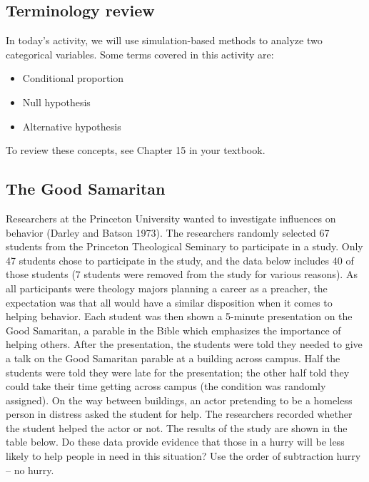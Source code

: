 \documentclass[
]{report}
\begin{document}
\subsection{Terminology review}\label{terminology-review-16}

In today's activity, we will use simulation-based methods to analyze two categorical variables. Some terms covered in this activity are:

\begin{itemize}
\item
  Conditional proportion
\item
  Null hypothesis
\item
  Alternative hypothesis
\end{itemize}

To review these concepts, see Chapter 15 in your textbook.

\subsection{The Good Samaritan}\label{the-good-samaritan}

Researchers at the Princeton University wanted to investigate influences on behavior (Darley and Batson 1973). The researchers randomly selected 67 students from the Princeton Theological Seminary to participate in a study. Only 47 students chose to participate in the study, and the data below includes 40 of those students (7 students were removed from the study for various reasons). As all participants were theology majors planning a career as a preacher, the expectation was that all would have a similar disposition when it comes to helping behavior. Each student was then shown a 5-minute presentation on the Good Samaritan, a parable in the Bible which emphasizes the importance of helping others. After the presentation, the students were told they needed to give a talk on the Good Samaritan parable at a building across campus. Half the students were told they were late for the presentation; the other half told they could take their time getting across campus (the condition was randomly assigned). On the way between buildings, an actor pretending to be a homeless person in distress asked the student for help. The researchers recorded whether the student helped the actor or not. The results of the study are shown in the table below. Do these data provide evidence that those in a hurry will be less likely to help people in need in this situation? Use the order of subtraction hurry -- no hurry.
\end{document}
